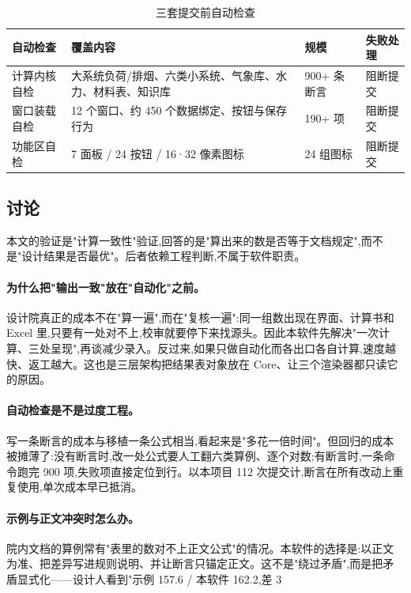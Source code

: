 \documentclass[UTF8,a4paper,zihao=-4]{ctexart}
\begin{document}
\begin{table}[H]
\centering
\caption{三套提交前自动检查}\label{tab:gates}
\small
\begin{tabular}{p{3.0cm}p{6.2cm}p{3.2cm}p{2.2cm}}
\toprule
自动检查 & 覆盖内容 & 规模 & 失败处理 \\
\midrule
计算内核自检 & 大系统负荷/排烟、六类小系统、气象库、水力、材料表、知识库 & 900+ 条断言 & 阻断提交 \\
窗口装载自检 & 12 个窗口、约 450 个数据绑定、按钮与保存行为 & 190+ 项 & 阻断提交 \\
功能区自检 & 7 面板 / 24 按钮 / 16·32 像素图标 & 24 组图标 & 阻断提交 \\
\bottomrule
\end{tabular}
\end{table}

\subsection{讨论}

本文的验证是"计算一致性"验证,回答的是"算出来的数是否等于文档规定",而不是"设计结果是否最优"。后者依赖工程判断,不属于软件职责。

\paragraph{为什么把"输出一致"放在"自动化"之前。}
设计院真正的成本不在"算一遍",而在"复核一遍":同一组数出现在界面、计算书和 Excel 里,只要有一处对不上,校审就要停下来找源头。因此本软件先解决"一次计算、三处呈现",再谈减少录入。反过来,如果只做自动化而各出口各自计算,速度越快、返工越大。这也是三层架构把结果表对象放在 Core、让三个渲染器都只读它的原因。

\paragraph{自动检查是不是过度工程。}
写一条断言的成本与移植一条公式相当,看起来是"多花一倍时间"。但回归的成本被摊薄了:没有断言时,改一处公式要人工翻六类算例、逐个对数;有断言时,一条命令跑完 900 项,失败项直接定位到行。以本项目 112 次提交计,断言在所有改动上重复使用,单次成本早已抵消。

\paragraph{示例与正文冲突时怎么办。}
院内文档的算例常有"表里的数对不上正文公式"的情况。本软件的选择是:以正文为准、把差异写进规则说明、并让断言只锚定正文。这不是"绕过矛盾",而是把矛盾显式化——设计人看到"示例 157.6 / 本软件 162.2,差 3%
\end{document}
